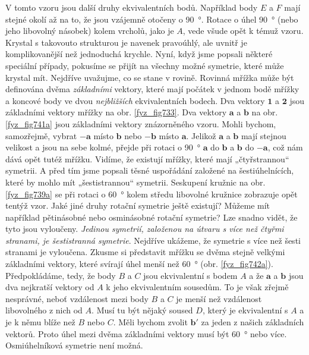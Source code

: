     V tomto vzoru jsou další druhy ekvivalentních bodů. Například body \(E\) a \(F\) mají stejné 
    okolí až na to, že jsou vzájemně otočeny o \SI{90}{\degree}. Rotace o úhel \SI{90}{\degree} 
    (nebo jeho libovolný násobek) kolem vrcholů, jako je \(A\), vede všude opět k témuž vzoru. 
    Krystal s takovouto strukturou je navenek pravoúhlý, ale uvnitř je komplikovanější než 
    jednoduchá krychle. Nyní, když jsme popsali některé speciální případy, pokusíme se přijít na 
    všechny možné symetrie, které může krystal mít. Nejdříve uvažujme, co se stane v rovině. 
    Rovinná mřížka může být definována dvěma \emph{základními} vektory, které mají počátek v jednom 
    bodě mřížky a koncové body ve dvou \emph{nejbližších} ekvivalentních bodech. Dva vektory 
    \(\bm{1}\) a \(\bm{2}\) jsou základními vektory mřížky na obr. \ref{fyz_fig733}. Dva vektory 
    \(\bm{a}\) a \(\bm{b}\) na obr. \ref{fyz_fig741a} jsou základními vektory znázorněného vzoru. 
    Mohli bychom, samozřejmě, vybrat \(\bm{-a}\) místo \(\bm{b}\) nebo \(\bm{-b}\) místo 
    \(\bm{a}\). Jelikož \(\bm{a}\) a \(\bm{b}\) mají stejnou velikost a jsou na sebe kolmé, přejde 
    při rotaci o \SI{90}{\degree} \(\bm{a}\) do \(\bm{b}\) a \(\bm{b}\) do \(\bm{-a}\), což nám 
    dává opět tutéž mřížku. Vidíme, že existují mřížky, které mají „čtyřstrannou“ symetrii. A před 
    tím jsme popsali těsné uspořádání založené na šestiúhelnících, které by mohlo mít 
    „šestistrannou“ symetrii. Seskupení kružnic na obr. \ref{fyz_fig739a} se při rotaci o 
    \SI{60}{\degree} kolem středu libovolné kružnice zobrazuje opět tentýž vzor. Jaké jiné druhy 
    rotační symetrie ještě existují? Můžeme mít například pětinásobné nebo osminásobné rotační 
    symetrie? Lze snadno vidět, že tyto jsou vyloučeny.\emph{ Jedinou symetrií, založenou na útvaru 
    s více než čtyřmi stranami, je šestistranná symetrie}. Nejdříve ukážeme, že symetrie s více než 
    šesti stranami je vyloučena. Zkusme si představit mřížku se dvěma stejně velkými základními 
    vektory, které svírají úhel menší než \SI{60}{\degree} (obr. \ref{fyz_fig742a}). Předpokládáme, 
    tedy, že body \(B\) a \(C\) jsou ekvivalentní s bodem \(A\) a že \(\bm{a}\) a \(\bm{b}\) jsou 
    dva nejkratší vektory od \(A\) k jeho ekvivalentním sousedům. To je však zřejmě nesprávné, 
    neboť vzdálenost mezi body \(B\) a \(C\) je menší než vzdálenost libovolného z nich od \(A\). 
    Musí tu být nějaký soused \(D\), který je ekvivalentní s \(A\) a je k němu blíže než \(B\) nebo 
    \(C\). Měli bychom zvolit \(\bm{b'}\) za jeden z našich základních vektorů. Proto úhel mezi 
    dvěma základními vektory musí být \SI{60}{\degree} nebo více. Osmiúhelníková symetrie není 
    možná.

